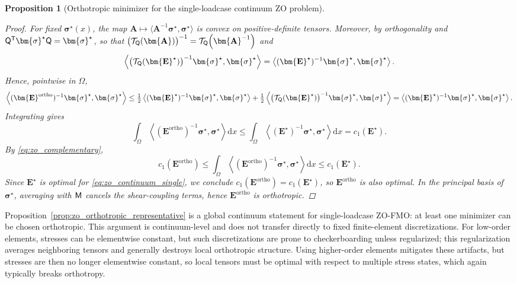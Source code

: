 \documentclass[preprint,3p]{elsarticle}
\newcommand{\tens}[1]{\bm{\mathit{#1}}}             %
\newcommand{\tenss}[1]{\bm{\mathbf{#1}}}            %
\newcommand{\tensf}[1]{\bm{\mathbf{#1}}}            %
\newcommand{\trn}{\mathsf{T}}                       %
\newcommand{\stress}{\tenss{\sigma}}                %
\newcommand{\semtrx}[1]{\ifcat\noexpand#1\relax\bm{#1}\else\mathsf{#1}\fi}
\newtheorem{proposition}{Proposition}[section]
\begin{document}
\begin{proposition}[Orthotropic minimizer for the single-loadcase continuum ZO problem]
\begin{proof}
For fixed $\stress^\star(\tens x)$, the map $\tensf A\mapsto\langle \tensf A^{-1}\stress^\star,\stress^\star\rangle$ is convex on positive-definite tensors. Moreover, by orthogonality and $\semtrx Q^\trn\stress^\star\semtrx Q=\stress^\star$, so that $\big(\mathcal T_{\semtrx Q}(\tensf A)\big)^{-1} = \mathcal T_{\semtrx Q}\!\left(\tensf A^{-1}\right)$ and
%
\begin{equation}
\left\langle \big(\mathcal T_{\semtrx Q}(\tensf E^\star)\big)^{-1}\stress^\star,\stress^\star\right\rangle
=
\left\langle (\tensf E^\star)^{-1}\stress^\star,\stress^\star\right\rangle.
\end{equation}
%
Hence, pointwise in $\Omega$,
%
\begin{equation}
\left\langle (\tensf E^{\mathrm{ortho}})^{-1}\stress^\star,\stress^\star\right\rangle
\le
\tfrac12\left\langle (\tensf E^\star)^{-1}\stress^\star,\stress^\star\right\rangle
+\tfrac12\left\langle \big(\mathcal T_{\semtrx Q}(\tensf E^\star)\big)^{-1}\stress^\star,\stress^\star\right\rangle
=
\left\langle (\tensf E^\star)^{-1}\stress^\star,\stress^\star\right\rangle.
\end{equation}
%
Integrating gives
%
\begin{equation}
\int_\Omega \left\langle (\tensf E^{\mathrm{ortho}})^{-1}\stress^\star,\stress^\star\right\rangle \mathrm d\tens x
\le
\int_\Omega \left\langle (\tensf E^\star)^{-1}\stress^\star,\stress^\star\right\rangle \mathrm d\tens x
=c_1(\tensf E^\star).
\end{equation}
%
By \eqref{eq:zo_complementary},
%
\begin{equation}
c_1(\tensf E^{\mathrm{ortho}})
\le
\int_\Omega \left\langle (\tensf E^{\mathrm{ortho}})^{-1}\stress^\star,\stress^\star\right\rangle \mathrm d\tens x
\le c_1(\tensf E^\star).
\end{equation}
%
Since $\tensf E^\star$ is optimal for \eqref{eq:zo_continuum_single}, we conclude $c_1(\tensf E^{\mathrm{ortho}})=c_1(\tensf E^\star)$, so $\tensf E^{\mathrm{ortho}}$ is also optimal. In the principal basis of $\stress^\star$, averaging with $\semtrx M$ cancels the shear-coupling terms, hence $\tensf E^{\mathrm{ortho}}$ is orthotropic.
\end{proof}
\end{proposition}

Proposition~\ref{prop:zo_orthotropic_representative} is a global continuum statement for single-loadcase ZO-FMO: at least one minimizer can be chosen orthotropic. This argument is continuum-level and does not transfer directly to fixed finite-element discretizations. For low-order elements, stresses can be elementwise constant, but such discretizations are prone to checkerboarding unless regularized; this regularization averages neighboring tensors and generally destroys local orthotropic structure. Using higher-order elements mitigates these artifacts, but stresses are then no longer elementwise constant, so local tensors must be optimal with respect to multiple stress states, which again typically breaks orthotropy. 
\end{document}

